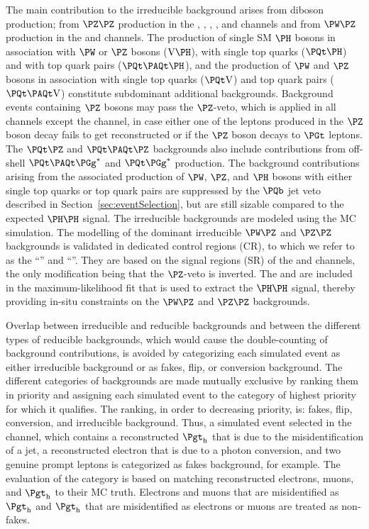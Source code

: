 The main contribution to the irreducible background arises from diboson production;
from $\PZ\PZ$ production in the \zeroLeptonFourTau, \oneLeptonThreeTau, \twoLeptonTwoTau, \threeLeptonOneTau, and \fourLeptonZeroTau channels
and from $\PW\PZ$ production in the \twoLeptonssZeroTau and \threeLeptonZeroTau channels.
The production of single SM $\PHiggs$ bosons in association with $\PW$ or $\PZ$ bosons ($\V\PHiggs$), with single top quarks ($\tH$) and with top quark pairs ($\ttH$),
and the production of $\PW$ and $\PZ$ bosons in association with single top quarks ($\tV$) and top quark pairs ($\ttV$) constitute subdominant additional backgrounds.
Background events containing $\PZ$ bosons may pass the $\PZ$-veto, which is applied in all channels except the \zeroLeptonFourTau channel,
in case either one of the leptons produced in the $\PZ$ boson decay fails to get reconstructed or if the $\PZ$ boson decays to $\PGt$ leptons.
The $\tZ$ and $\ttZ$ backgrounds also include contributions from off-shell $\Ptop\APtop\Pggx$ and $\Ptop\Pggx$ production.
The background contributions arising from the associated production of $\PW$, $\PZ$, and $\PHiggs$ bosons with either single top quarks or top quark pairs
are suppressed by the $\Pbottom$ jet veto described in Section~\ref{sec:eventSelection}, but are still sizable compared to the expected $\PHiggs\PHiggs$ signal.
The irreducible backgrounds are modeled using the MC simulation.
The modelling of the dominant irreducible $\PW\PZ$ and $\PZ\PZ$ backgrounds is validated in dedicated control regions (CR),
to which we refer to as the ``\threeLeptonCR'' and ``\fourLeptonCR''.
They are based on the signal regions (SR) of the \threeLeptonZeroTau and \fourLeptonZeroTau channels,
the only modification being that the $\PZ$-veto is inverted.
The \threeLeptonCR and \fourLeptonCR are included in the maximum-likelihood fit that is used to extract the $\PHiggs\PHiggs$ signal,
thereby providing in-situ constraints on the $\PW\PZ$ and $\PZ\PZ$ backgrounds.

Overlap between irreducible and reducible backgrounds and between the different types of reducible backgrounds,
which would cause the double-counting of background contributions,
is avoided by categorizing each simulated event as either irreducible background or as fakes, flip, or conversion background.
The different categories of backgrounds are made mutually exclusive by ranking them in priority and assigning each simulated event to the category of highest priority for which it qualifies.
The ranking, in order to decreasing priority, is: fakes, flip, conversion, and irreducible background.
Thus, a simulated event selected in the \threeLeptonOneTau channel, which contains a reconstructed $\tauh$ that is due to the misidentification of a jet,
a reconstructed electron that is due to a photon conversion, and two genuine prompt leptons is categorized as fakes background, for example.
The evaluation of the category is based on matching reconstructed electrons, muons, and $\tauh$ to their MC truth.
Electrons and muons that are misidentified as $\tauh$ and $\tauh$ that are misidentified as electrons or muons are treated as non-fakes.


